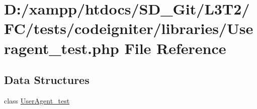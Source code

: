 \hypertarget{tests_2codeigniter_2libraries_2_useragent__test_8php}{}\section{D\+:/xampp/htdocs/\+S\+D\+\_\+\+Git/\+L3\+T2/\+F\+C/tests/codeigniter/libraries/\+Useragent\+\_\+test.php File Reference}
\label{tests_2codeigniter_2libraries_2_useragent__test_8php}
\subsection*{Data Structures}
\begin{DoxyCompactItemize}
\item 
class \hyperlink{class_user_agent__test}{User\+Agent\+\_\+test}
\end{DoxyCompactItemize}
